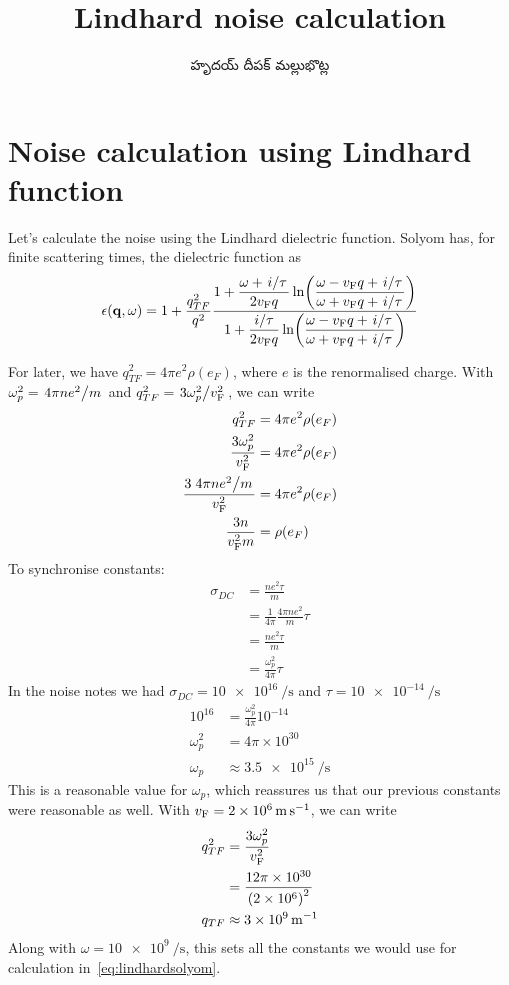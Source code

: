 \documentclass[../main.tex]{subfiles}
\title{Lindhard noise calculation}
\author{\begin{telugu}హృదయ్ దీపక్ మల్లుభొట్ల\end{telugu}}
\date{}
\begin{document}
	\onlyinsubfile{\maketitle}


	\section{Noise calculation using Lindhard function} \label{sec:lindc:intro}

	Let's calculate the noise using the Lindhard dielectric function.
	Solyom\supercite{SolyomV3} has, for finite scattering times, the dielectric function as
	\begin{equation}
		\epsilon(\vec{q}, \omega) = 1 + \frac{q_{TF}^2}{q^2}\frac{\displaystyle 1 + \frac{\omega + \flatfrac{i}{\tau}}{2 \vf q} \ln(\frac{\omega - \vf q + \flatfrac{i}{\tau}}{\omega + \vf q + \flatfrac{i}{\tau}})}{\displaystyle 1 + \frac{\flatfrac{i}{\tau}}{2 \vf q} \ln(\frac{\omega - \vf q + \flatfrac{i}{\tau}}{\omega + \vf q + \flatfrac{i}{\tau}})} \label{eq:lindhardsolyom}
	\end{equation}

	For later, we have $q_{TF}^2 = 4 \pi e^2 \rho(e_F)$, where $e$ is the renormalised charge.
	With $\omega_p^2 = \flatfrac{4 \pi n e^2}{m}$ and $q_{TF}^2 = \flatfrac{3 \omega_p^2}{\vf^2}$, we can write
	\begin{align}
		q_{TF}^2 &= 4 \pi e^2 \rho(e_F) \\
		\frac{3 \omega_p^2}{\vf^2} &= 4 \pi e^2 \rho(e_F) \\
		\frac{3 \flatfrac{4 \pi n e^2}{m}}{\vf^2} &= 4 \pi e^2 \rho(e_F) \\
		\frac{3n}{\vf^2 m} &= \rho(e_F) \\
	\end{align}
	To synchronise constants:
	\begin{align}
		\sigma_{DC} &= \frac{n e^2 \tau}{m} \\
		&= \frac{1}{4\pi}\frac{4 \pi n e^2}{m} \tau \\
		&= \frac{n e^2 \tau}{m} \\
		&= \frac{\omega_p^2}{4\pi}\tau
	\end{align}
	In the noise notes we had $\sigma_{DC} = \SI{10e16}{\per\second}$ and $\tau = \SI{10e-14}{\per\second}$
	\begin{align}
		10^{16} &= \frac{\omega_p^2}{4\pi} 10^{-14}\\
		\omega_p^2 &= 4 \pi \times 10^{30} \\
		\omega_p &\approx \SI{3.5e15}{\per\second}
	\end{align}
	This is a reasonable value for $\omega_p$, which reassures us that our previous constants were reasonable as well.
	With $\vf = \SI{2e6}{\m \per \s}$, we can write
	\begin{align}
		q_{TF}^2 &= \frac{3 \omega_p^2}{\vf^2} \\
		&= \frac{12\pi \times 10^{30}}{\left( 2 \times 10^6 \right)^2} \\
		q_{TF} &\approx \SI{3e9}{\per\m}
	\end{align}
	Along with $\omega = \SI{10e9}{\per\second}$, this sets all the constants we would use for calculation in~\eqref{eq:lindhardsolyom}.
\end{document}
